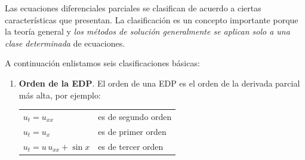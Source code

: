 Las ecuaciones diferenciales parciales se clasifican de acuerdo a ciertas características que presentan. La clasificación es un concepto importante porque la teoría general y \emph{los métodos de solución generalmente se aplican solo a una clase determinada} de ecuaciones.
\par
A continuación enlistamos seis clasificaciones básicas:
\begin{enumerate}
\item \textbf{Orden de la EDP}. El orden de una EDP es el orden de la derivada parcial más alta, por ejemplo:
\begin{table}[H]
\centering
\large
\begin{tabular}{l l}
\large{$u_{t} = u_{xx}$} & es de segundo orden \\
\large{$u_{t} = u_{x}$} & es de primer orden \\
\large{$u_{t} = u \, u_{xx} + \sin x$} & es de tercer orden
\end{tabular}
\end{table}


\end{enumerate}
